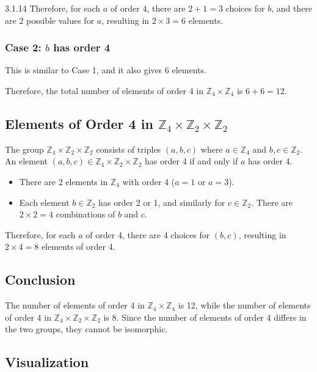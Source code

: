 \documentclass[12pt]{amsart}
\theoremstyle{definition}
\numberwithin{equation}{section}
\newcommand{\Z}{\mathbb{Z}}
\begin{document}
\begin{exercise}{3.1.14}
    Therefore, for each \(a\) of order 4, there are \(2 + 1 = 3\) choices for \(b\), and there are 2 possible values for \(a\), resulting in \(2 \times 3 = 6\) elements.

    \subsubsection*{Case 2: \(b\) has order 4}

    This is similar to Case 1, and it also gives 6 elements.

    Therefore, the total number of elements of order 4 in \(\Z_4 \times \Z_4\) is \(6 + 6 = 12\).

    \subsection*{Elements of Order 4 in \(\Z_4 \times \Z_2 \times \Z_2\)}

    The group \(\Z_4 \times \Z_2 \times \Z_2\) consists of triples \((a, b, c)\) where \(a \in \Z_4\) and \(b, c \in \Z_2\). An element \((a, b, c) \in \Z_4 \times \Z_2 \times \Z_2\) has order 4 if and only if \(a\) has order 4.

    \begin{itemize}
        \item There are 2 elements in \(\Z_4\) with order 4 (\(a = 1\) or \(a = 3\)).
        \item Each element \(b \in \Z_2\) has order 2 or 1, and similarly for \(c \in \Z_2\). There are \(2 \times 2 = 4\) combinations of \(b\) and \(c\).
    \end{itemize}

    Therefore, for each \(a\) of order 4, there are 4 choices for \((b, c)\), resulting in \(2 \times 4 = 8\) elements of order 4.

    \subsection*{Conclusion}

    The number of elements of order 4 in \(\Z_4 \times \Z_4\) is 12, while the number of elements of order 4 in \(\Z_4 \times \Z_2 \times \Z_2\) is 8. Since the number of elements of order 4 differs in the two groups, they cannot be isomorphic.

    \subsection*{Visualization}


\end{exercise}
\end{document}
